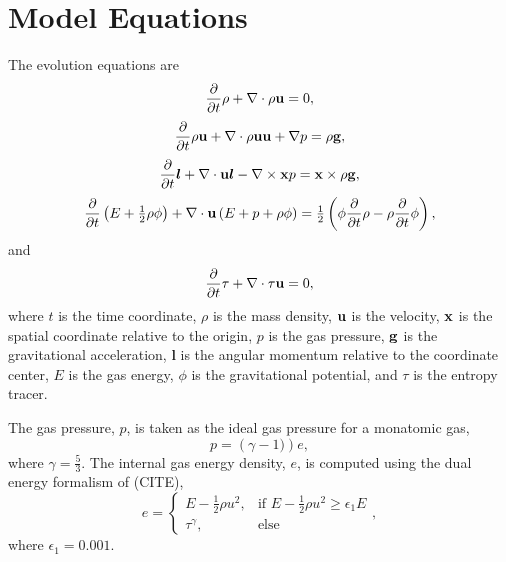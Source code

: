 \documentclass{aastex63}
\begin{document}
\newcommand{\ddt}[1]{\frac{\partial}{\partial t} #1} 
\newcommand{\divergence}[1]{{\bf \nabla} \cdot #1}
\newcommand{\curl}[1]{{\bf \nabla} \times #1}
\newcommand{\gradient}[1]{{\bf \nabla} #1}
\newcommand{\vect}[1]{{\bf #1}}
\newcommand{\am}{\bm{l}}


\section{Model Equations}
The evolution equations are
\begin{equation}
\ddt{\rho}+\divergence{\rho\vect{u}}=0,
\label{rho}
\end{equation}
\begin{equation}
\ddt{\rho \vect{u}}+\divergence{\rho\vect{u}\vect{u} + \gradient{p}}=\rho \vect{g},
\label{rhou}
\end{equation}
\begin{equation}
\ddt{\am}+\divergence{\vect{u}\am - \curl{\vect{x} p}}=\vect{x}\times\rho \vect{g},
\label{am}
\end{equation}
\begin{equation}
\ddt{\left(E+\tfrac{1}{2}\rho\phi\right)}+\divergence{\vect{u}\left(E+p+\rho\phi\right)}=\tfrac{1}{2}\left(\phi\ddt{\rho}-\rho\ddt{\phi}\right),
\label{E}
\end{equation}
and
\begin{equation}
\ddt{\tau}+\divergence{\tau\vect{u}}=0,
\label{tau}
\end{equation}
where $t$ is the time coordinate, $\rho$ is the mass density, $\vect{u}$ is the velocity, $\vect{x}$ is the spatial coordinate relative to the origin, 
$p$ is the gas pressure, $\vect{g}$ is the gravitational acceleration, 
$\am$ is the angular momentum relative to the coordinate center, $E$ is the gas energy, $\phi$ is the gravitational potential, and $\tau$ is the entropy
tracer.

The gas pressure, $p$, is taken as the ideal gas pressure for a monatomic gas, 
\begin{equation}
p = \left( \gamma - 1 ) \right) e, 
\end{equation}
where $\gamma = \tfrac{5}{3}$. The internal gas energy density, $e$, is computed using the dual energy formalism of (CITE),
\begin{equation}
    e = 
\begin{cases}
    E - \tfrac{1}{2} \rho u^2, & \text{if } E - \tfrac{1}{2} \rho u^2 \geq \epsilon_1 E\\
    \tau^{\gamma},             & \text{else}
\end{cases},
\end{equation}
where $\epsilon_1 = 0.001$.
\end{document}
